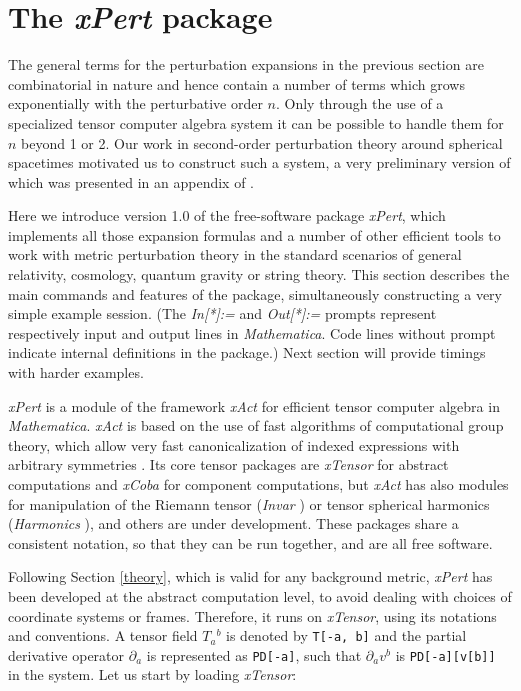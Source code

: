 \documentclass[aps,prd,showpacs]{revtex4}
\newcommand{\xPert}{{\em \lowercase{x}P\lowercase{ert}}}
\begin{document}
\section{The \xPert\/ package}\label{code}

The general terms for the perturbation expansions in the previous section
are combinatorial in nature and hence contain a number of terms which
grows exponentially with the perturbative order $n$. Only through the use
of a specialized tensor computer algebra system it can be possible to
handle them for $n$ beyond 1 or 2.
Our work in second-order perturbation theory around spherical spacetimes
\cite{BMM06, BMM07} motivated us to construct such a system,
a very preliminary version of which was presented in an appendix of
\cite{BMM06}.

Here we introduce version 1.0 of the free-software package \xPert,
which implements all those expansion formulas and a number of other
efficient tools to work with metric perturbation theory in the standard
scenarios of general relativity, cosmology, quantum gravity or string
theory.
This section describes the main commands and features of the
package, simultaneously constructing a very simple example session.
(The {\em In[*]:=} and {\em Out[*]:=} prompts represent respectively
input and output lines in {\em Mathematica}. Code lines without prompt
indicate internal definitions in the package.)
Next section will provide timings with harder examples.

\xPert\/ is a module of the framework {\em xAct} \cite{xAct} for
efficient tensor computer algebra in {\em Mathematica}.
{\em xAct} is based on the use of fast algorithms of computational group
theory, which allow very fast canonicalization of indexed expressions
with arbitrary symmetries \cite{Portugal, xPerm}.
Its core tensor packages are {\em xTensor} for abstract computations
and {\em xCoba} for component computations, but {\em xAct} has also
modules for manipulation of the Riemann tensor ({\em Invar} \cite{Invar2})
or tensor spherical harmonics ({\em Harmonics} \cite{xAct}),
and others are under development.
These packages share a consistent notation, so that they can be run
together, and are all free software.

Following Section \ref{theory}, which is valid for any background metric,
\xPert\/ has been developed at the abstract computation level, to
avoid dealing with choices of coordinate systems or frames. Therefore,
it runs on {\em xTensor}, using its notations and conventions.
A tensor field $T_a{}^b$ is denoted by {\tt T[-a, b]} and the
partial derivative operator $\partial_a$ is represented as
{\tt PD[-a]}, such that $\partial_a v^b$ is
{\tt PD[-a][v[b]]} in the system. Let us start by loading
{\em xTensor}:
\end{document}
